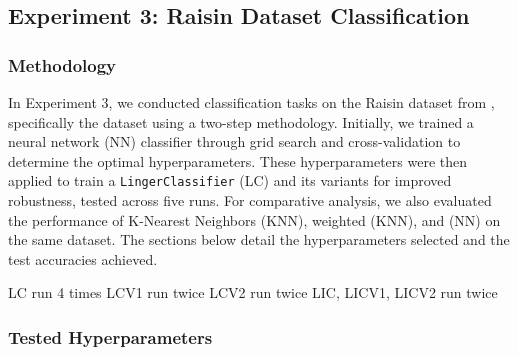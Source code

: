\documentclass[a4paper, 12pt]{report}
\begin{document}
\subsection{Experiment 3: Raisin Dataset Classification}
\subsubsection{Methodology}
In Experiment 3, we conducted classification tasks on the Raisin dataset from \cite{uciDatasets}, specifically the dataset \cite{misc_raisin_850} using a two-step methodology. Initially, we trained a neural network (NN) classifier 
through grid search and cross-validation to determine the optimal hyperparameters. These hyperparameters were then applied to train a \texttt{LingerClassifier} (LC) 
and its variants for improved robustness, tested across five runs.
For comparative analysis, we also evaluated the performance of K-Nearest Neighbors (KNN), 
weighted (KNN), and (NN) on the same dataset. The sections below detail the hyperparameters selected and the test accuracies achieved.

LC run 4 times
LCV1 run twice 
LCV2 run twice 
LIC, LICV1, LICV2 run twice
\subsubsection{Tested Hyperparameters}
\end{document}
